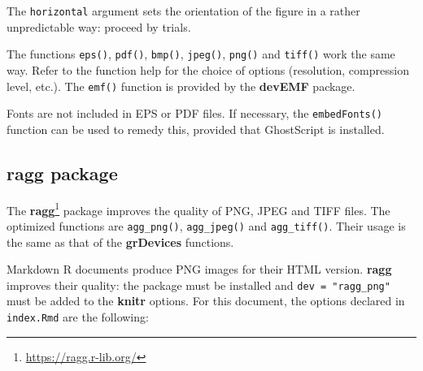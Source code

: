 \documentclass[
  12pt,
  american,
  a4paper,
  extrafontsizes,onecolumn,openright
  ]{memoir}
\newenvironment{Shaded}{\begin{snugshade}}{\end{snugshade}}
\newcommand{\AttributeTok}[1]{\textcolor[rgb]{0.13,0.29,0.53}{#1}}
\newcommand{\CommentTok}[1]{\textcolor[rgb]{0.56,0.35,0.01}{\textit{#1}}}
\newcommand{\ConstantTok}[1]{\textcolor[rgb]{0.56,0.35,0.01}{#1}}
\newcommand{\DecValTok}[1]{\textcolor[rgb]{0.00,0.00,0.81}{#1}}
\newcommand{\FunctionTok}[1]{\textcolor[rgb]{0.13,0.29,0.53}{\textbf{#1}}}
\newcommand{\NormalTok}[1]{#1}
\newcommand{\SpecialCharTok}[1]{\textcolor[rgb]{0.81,0.36,0.00}{\textbf{#1}}}
\newcommand{\StringTok}[1]{\textcolor[rgb]{0.31,0.60,0.02}{#1}}
\begin{document}
The \texttt{horizontal} argument sets the orientation of the figure in a rather unpredictable way: proceed by trials.

The functions \texttt{eps()}, \texttt{pdf()}, \texttt{bmp()}, \texttt{jpeg()}, \texttt{png()} and \texttt{tiff()} work the same way.
Refer to the function help for the choice of options (resolution, compression level, etc.).
The \texttt{emf()} function is provided by the \textbf{devEMF} package.

Fonts are not included in EPS or PDF files.
If necessary, the \texttt{embedFonts()} function can be used to remedy this, provided that GhostScript is installed.

\subsection{ragg package}\label{ragg-package}

The \textbf{ragg}\footnote{\url{https://ragg.r-lib.org/}} package improves the quality of PNG, JPEG and TIFF files.
The optimized functions are \texttt{agg\_png()}, \texttt{agg\_jpeg()} and \texttt{agg\_tiff()}.
Their usage is the same as that of the \textbf{grDevices} functions.

Markdown R documents produce PNG images for their HTML version.
\textbf{ragg} improves their quality: the package must be installed and \texttt{dev\ =\ "ragg\_png"} must be added to the \textbf{knitr} options.
For this document, the options declared in \texttt{index.Rmd} are the following:

\scriptsize

\begin{Shaded}
\end{Shaded}
\end{document}
